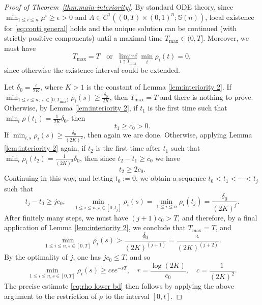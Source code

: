 \documentclass[10pt]{article}
\numberwithin{equation}{section}
\newcommand{\bS}{\mathbb S}
\begin{document}
\begin{proof}[Proof of Theorem~\ref{thm:main-interiority}]
By standard ODE theory, since $\min_{1\leq i\leq n}\mu^i\geq \epsilon>0$ and $A \in C^{1}((0,T)\times (0,1)^n;\bS(n))$, local existence for \eqref{eq:conti general} holds and the unique solution can be continued (with strictly positive components) until a maximal time $T_{\max}\in (0, T]$. Moreover, we must have
\begin{equation}
    T_{\max}=T\;\; \text{ or } \;\liminf_{t\uparrow T_{\max}}\min_{i}\rho_i(t)=0,
\end{equation}
since otherwise the existence interval could be extended. 

Let $\delta_0=\frac{\epsilon}{2K}$, where $K>1$ is the constant of Lemma \ref{lem:interiority 2}. If $\min_{1\leq i\leq n,\; s\in [0,T_{\max})}\rho_i(s) \geq \frac{\delta_0}{2K}$, then $T_{\max}=T$ and there is nothing to prove. Otherwise, by Lemma \ref{lem:interiority 2}, if $t_1$ is the first time such that $\min_{i}\rho(t_1)=\frac{1}{2K}\delta_0$, then
\begin{equation}
    t_1\geq c_0>0.
\end{equation}
If $\min_{i,s}\rho_i(s) \geq \frac{\delta_0}{(2K)^2}$, then again we are done. Otherwise, applying Lemma \ref{lem:interiority 2} again, if $t_2$ is the first time after $t_1$ such that $\min_{i}\rho_i(t_2)=\frac{1}{(2K)^2}\delta_0$, then since $t_2-t_1\ge c_0$ we have 
\begin{equation}
    t_2 \geq 2c_0.
\end{equation}
Continuing in this way, and letting $t_0:=0$, we obtain a sequence $t_0<t_1<\cdots <t_j$ such that
\begin{equation}
    t_j-t_0\geq jc_0, \quad \min_{1\leq i\leq n, s\in [0,t_j]}\rho_i(s)=\min_{1\leq i\leq n}\rho_i(t_j)=\frac{\delta_0}{(2K)^{j}}.
\end{equation}
After finitely many steps, we must have $(j+1)c_0> T$, and therefore, by a final application of Lemma \ref{lem:interiority 2}, we conclude that $T_{\max}=T$, and
\begin{equation}
 \min_{1\leq i\leq n, s\in [0,T]}\rho_i(s)>  \frac{\delta_0}{(2K)^{(j+1)}}=\frac{\epsilon}{(2K)^{(j+2)}}. 
\end{equation}
By the optimality of $j$, one has $jc_0\leq T$, and so
\begin{equation}
 \min_{1\leq i\leq n, s\in [0,T]}\rho_i(s)\geq c\epsilon e^{-rT}, \quad r=\frac{\log(2K)}{c_0}, \quad  c=\frac{1}{(2K)^2}.
\end{equation}
The precise estimate \eqref{eq:rho lower bd} then follows by applying the above argument to the restriction of $\rho$ to the interval $[0,t]$.
\end{proof}
\end{document}
